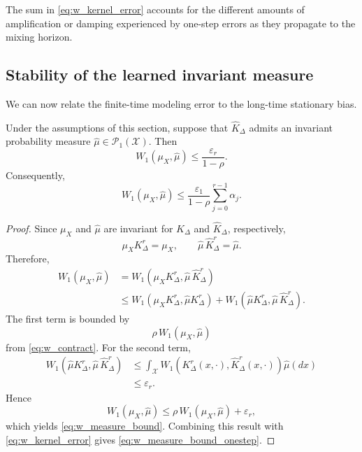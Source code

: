 \documentclass[final,hidelinks]{siamart251216}
\newcommand{\cX}{\mathcal{X}}
\newcommand{\Wone}{W_1}
\begin{document}
The sum in \eqref{eq:w_kernel_error} accounts for the different amounts
of amplification or damping experienced by one-step errors as they
propagate to the mixing horizon.

\subsection{Stability of the learned invariant measure}

We can now relate the finite-time modeling error to the long-time stationary
bias.

\begin{proposition}
\label{prop:wasserstein}
Under the assumptions of this section, suppose that $\widehat K_\Delta$
admits an invariant probability measure
$\widehat\mu\in\mathcal P_1(\cX)$. Then
\begin{equation}
\boxed{
    \Wone(\mu_X,\widehat\mu)
    \le
    \frac{\varepsilon_r}{1-\rho}.
}
    \label{eq:w_measure_bound}
\end{equation}
Consequently,
\begin{equation}
\boxed{
    \Wone(\mu_X,\widehat\mu)
    \le
    \frac{\varepsilon_1}{1-\rho}
    \sum_{j=0}^{r-1}\alpha_j .
}
    \label{eq:w_measure_bound_onestep}
\end{equation}
\end{proposition}

\begin{proof}
Since $\mu_X$ and $\widehat\mu$ are invariant for $K_\Delta$ and
$\widehat K_\Delta$, respectively,
\[
    \mu_XK_\Delta^r=\mu_X,
    \qquad
    \widehat\mu\,\widehat K_\Delta^r=\widehat\mu.
\]
Therefore,
\begin{align*}
    \Wone(\mu_X,\widehat\mu)
    &=
    \Wone(
        \mu_XK_\Delta^r,
        \widehat\mu\,\widehat K_\Delta^r
    ) \\
    &\le
    \Wone(
        \mu_XK_\Delta^r,
        \widehat\mu K_\Delta^r
    )
    +
    \Wone(
        \widehat\mu K_\Delta^r,
        \widehat\mu\,\widehat K_\Delta^r
    ).
\end{align*}
The first term is bounded by
\[
    \rho\,\Wone(\mu_X,\widehat\mu)
\]
from \eqref{eq:w_contract}. For the second term,
\begin{align*}
    \Wone(
        \widehat\mu K_\Delta^r,
        \widehat\mu\,\widehat K_\Delta^r
    )
    &\le
    \int_{\cX}
    \Wone\!\left(
        K_\Delta^r(x,\cdot),
        \widehat K_\Delta^r(x,\cdot)
    \right)
    \widehat\mu(dx) \\
    &\le
    \varepsilon_r.
\end{align*}
Hence
\[
    \Wone(\mu_X,\widehat\mu)
    \le
    \rho\,\Wone(\mu_X,\widehat\mu)
    +
    \varepsilon_r,
\]
which yields \eqref{eq:w_measure_bound}. Combining this result with
\eqref{eq:w_kernel_error} gives
\eqref{eq:w_measure_bound_onestep}.
\end{proof}
\end{document}
